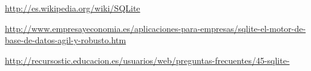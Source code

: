 \begin{thebibliography}{9}
  
\url{http://es.wikipedia.org/wiki/SQLite}

\url{http://www.empresayeconomia.es/aplicaciones-para-empresas/sqlite-el-motor-de-base-de-datos-agil-y-robusto.htm}

\url{http://recursostic.educacion.es/usuarios/web/preguntas-frecuentes/45-sqlite-}

\end{thebibliography}
